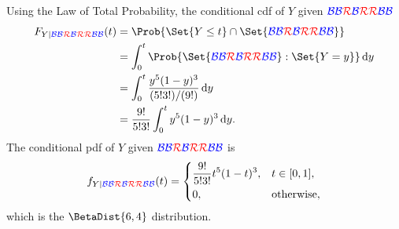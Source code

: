 \begin{Example}{}{}
    Using the Law of Total Probability, the conditional cdf of
    $ Y $ given $ \B\B\R\B\R\R\B\B $
    \begin{align*}
        F_{Y\mid \B\B\R\B\R\R\B\B}(t)
         & =\Prob{\Set{Y\le t}\cap\Set{\B\B\R\B\R\R\B\B}}      \\
         & =\int_{0}^{t}\Prob{\Set{\B\B\R\B\R\R\B\B}\given
        \Set{Y=y}}\odif{y}                                     \\
         & =\int_{0}^{t}\frac{y^5(1-y)^3}{(5!3!)/(9!)}\odif{y} \\
         & =\frac{9!}{5!3!}\int_{0}^{t}y^5(1-y)^3\odif{y}.
    \end{align*}
    The conditional pdf of $ Y $ given $ \B\B\R\B\R\R\B\B $ is
    \[
        f_{Y\mid \B\B\R\B\R\R\B\B}(t)
        =\begin{dcases} \frac{9!}{5!3!}t^5(1-t)^3, & t\in[0,1],        \\
               0,                         & \text{otherwise},\end{dcases} \]
    which is the
    $ \BetaDist{6,4} $ distribution.
\end{Example}